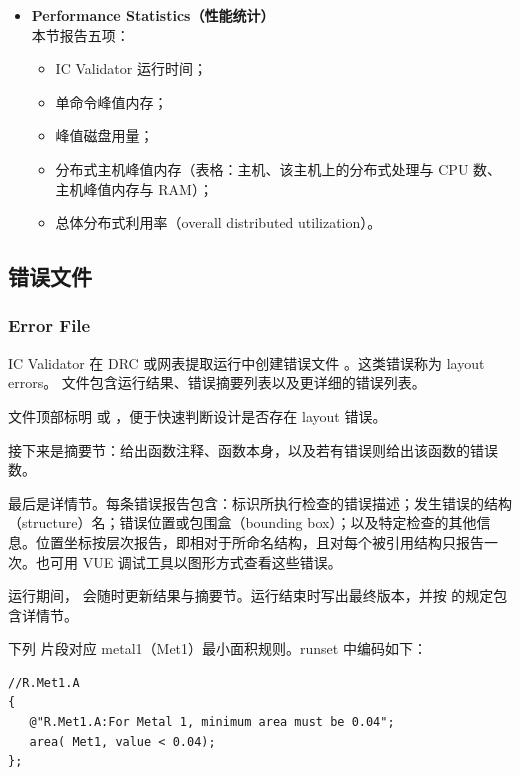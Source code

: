 \begin{itemize}
  \item \textbf{Performance Statistics（性能统计）}\\
  本节报告五项：
  \begin{itemize}
    \item IC Validator 运行时间；
    \item 单命令峰值内存；
    \item 峰值磁盘用量；
    \item 分布式主机峰值内存（表格：主机、该主机上的分布式处理与 CPU 数、主机峰值内存与 RAM）；
    \item 总体分布式利用率（overall distributed utilization）。
  \end{itemize}
\end{itemize}

\subsection{错误文件}
\subsubsection*{Error File}

IC Validator 在 DRC 或网表提取运行中创建错误文件 。这类错误称为 layout errors。 文件包含运行结果、错误摘要列表以及更详细的错误列表。

文件顶部标明  或 ，便于快速判断设计是否存在 layout 错误。

接下来是摘要节：给出函数注释、函数本身，以及若有错误则给出该函数的错误数。

最后是详情节。每条错误报告包含：标识所执行检查的错误描述；发生错误的结构（structure）名；错误位置或包围盒（bounding box）；以及特定检查的其他信息。位置坐标按层次报告，即相对于所命名结构，且对每个被引用结构只报告一次。也可用 VUE 调试工具以图形方式查看这些错误。

运行期间， 会随时更新结果与摘要节。运行结束时写出最终版本，并按  的规定包含详情节。

下列  片段对应 metal1（Met1）最小面积规则。runset 中编码如下：
\begin{lstlisting}[style=pxl]
//R.Met1.A
{
   @"R.Met1.A:For Metal 1, minimum area must be 0.04";
   area( Met1, value < 0.04);
};
\end{lstlisting}

